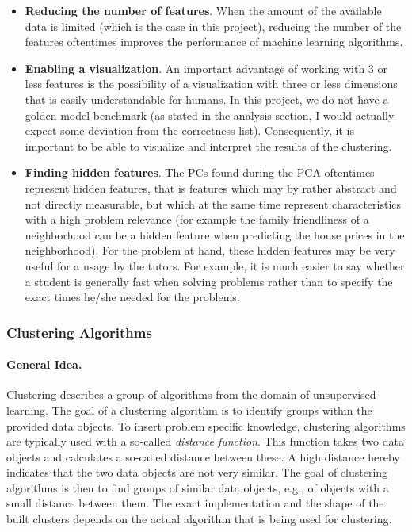 \begin{itemize}
	\item \textbf{Reducing the number of features}. When the amount of the available data is limited (which is the case in this project), reducing the number of the features oftentimes improves the performance of machine learning algorithms.
	\item \textbf{Enabling a visualization}. An important advantage of working with 3 or less features is the possibility of a visualization with three or less dimensions that is easily understandable for humans. In this project, we do not have a golden model benchmark (as stated in the analysis section, I would actually expect some deviation from the correctness list). Consequently, it is important to be able to visualize and interpret the results of the clustering. 
	\item \textbf{Finding hidden features}. The PCs found during the PCA oftentimes represent hidden features, that is features which may by rather abstract and not directly measurable, but which at the same time represent characteristics with a high problem relevance (for example the family friendliness of a neighborhood can be a hidden feature when predicting the house prices in the neighborhood). For the problem at hand, these hidden features may be very useful for a usage by the tutors. For example, it is much easier to say whether a student is generally fast when solving problems rather than to specify the exact times he/she needed for the problems.   
\end{itemize}

\subsubsection{Clustering Algorithms}

\paragraph{General Idea.} Clustering describes a group of algorithms from the domain of unsupervised learning. The goal of a clustering algorithm is to identify groups within the provided data objects. To insert problem specific knowledge, clustering algorithms are typically used with a so-called \emph{distance function}. This function takes two data objects and calculates a so-called distance between these. A high distance hereby indicates that the two data objects are not very similar. The goal of clustering algorithms is then to find groups of similar data objects, e.g., of objects with a small distance between them. The exact implementation and the shape of the built clusters depends on the actual algorithm that is being used for clustering.  

